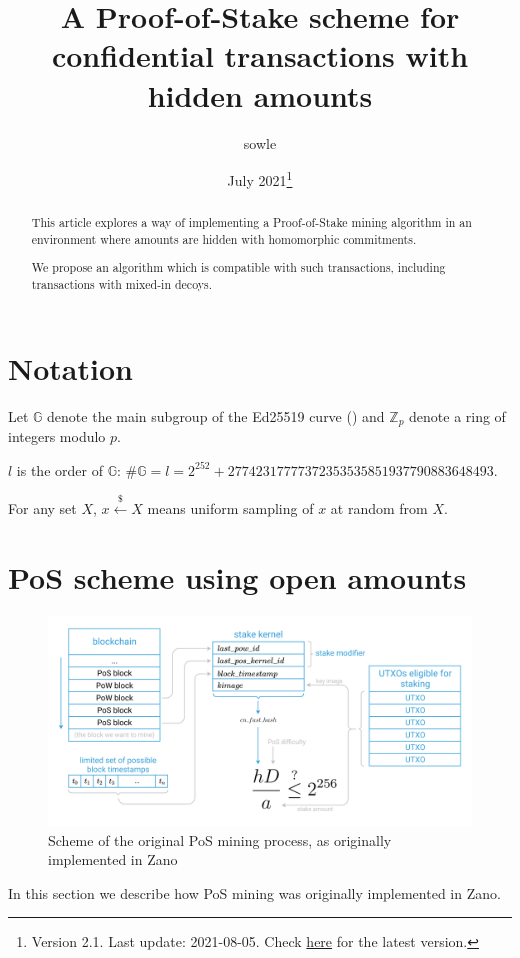 \documentclass{article}
\title{\huge{\textbf{A Proof-of-Stake scheme for confidential transactions with hidden amounts}}}
\author{\large{sowle}}
\affil{\small{Zano project \\ \texttt{val@zano.org} \\ \url{https://zano.org}}}
\date{\small{July 2021\footnote{Version 2.1. Last update: 2021-08-05. Check \href{https://github.com/hyle-team/docs/tree/master/PoS/PoS_with_HA}{here} for the latest version.}}}
\numberwithin{figure}{section}
\begin{document}
\maketitle

\begin{abstract}
This article explores a way of implementing a Proof-of-Stake mining algorithm in an environment where amounts are hidden with homomorphic commitments.

We propose an algorithm which is compatible with such transactions, including transactions with mixed-in decoys.
\end{abstract}

\section{Notation}
Let $\mathbb{G}$ denote the main subgroup of the Ed25519 curve (\cite{ed25519_site}) and $\mathbb{Z}_p$ denote a ring of integers modulo $p$.

$l$ is the order of $\mathbb{G}$: $\#\mathbb{G} = l = 2^{252} + 27742317777372353535851937790883648493$.

For  any  set $X$, $x \stackrel{\$}{\leftarrow} X$ means uniform  sampling of $x$ at random from $X$. 



\section{PoS scheme using open amounts} \label{sec_open_amounts}

\begin{figure}[ht!]
\centering
\includegraphics[scale=0.665]{fig_1.png}
\caption{Scheme of the original PoS mining process, as originally implemented in Zano}
\label{fig:1.1}
\end{figure}

\indent
In this section we describe how PoS mining was originally implemented in Zano.
\end{document}
